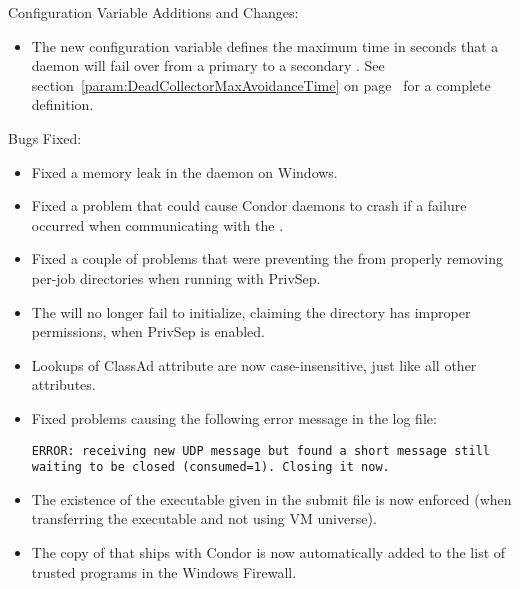 \noindent Configuration Variable Additions and Changes:

\begin{itemize}

\item The new configuration variable
   defines the maximum
  time in seconds that a daemon will fail over from a primary
   to a secondary .
  See section~\ref{param:DeadCollectorMaxAvoidanceTime} on
  page~\pageref{param:DeadCollectorMaxAvoidanceTime} for a
  complete definition.

\end{itemize}

\noindent Bugs Fixed:

\begin{itemize}

\item Fixed a memory leak in the  daemon on Windows.

\item Fixed a problem that could cause Condor daemons to crash if a
  failure occurred when communicating with the .

\item Fixed a couple of problems that were preventing the
   from properly removing per-job directories
  when running with PrivSep.

\item The  will no longer fail to initialize, 
  claiming the  directory has improper permissions,
  when PrivSep is enabled.

\item Lookups of ClassAd attribute  are now
  case-insensitive, just like all other attributes.

\item Fixed problems causing the following error message in the log file:

\footnotesize
\begin{verbatim}
ERROR: receiving new UDP message but found a short message still waiting to be closed (consumed=1). Closing it now.
\end{verbatim}
\normalsize

\item The existence of the executable given in the submit file is now 
  enforced (when transferring the executable and not using VM 
  universe).

\item The copy of  that ships with Condor is now automatically 
  added to the list of trusted programs in the Windows Firewall.


\end{itemize}

